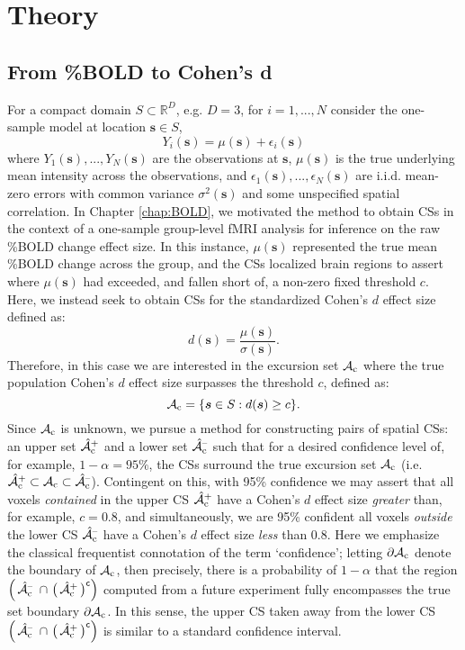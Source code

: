 \section{Theory}
\subsection{From \%BOLD to Cohen's d}
\label{sec:BOLD_to_cohen}
For a compact domain $S \subset \mathbb{R}^{D}$, e.g. $D = 3$, for $i = 1, ..., N$  consider the one-sample model at location $\bm{s} \in S$,
\begin{equation}
\label{eq:Cohen_GLM}
Y_{i}(\bm{s}) = \mu(\bm{s}) + \epsilon_{i}(\bm{s})
\end{equation}
where $Y_{1}(\bm{s}), ..., Y_{N}(\bm{s})$ are the observations at $\bm{s}$, $\mu(\bm{s})$ is the true underlying mean intensity across the observations,  
and $\epsilon_{1}(\bm{s}), ..., \epsilon_{N}(\bm{s})$ are i.i.d. mean-zero errors with common variance $\sigma^2(\bm{s})$ and some unspecified spatial correlation. In Chapter \ref{chap:BOLD}, we motivated the method to obtain CSs in the context of a one-sample group-level fMRI analysis for inference on the raw \%BOLD change effect size. In this instance, $\mu(\bm{s})$ represented the true mean \%BOLD change across the group, and the CSs localized brain regions to assert where $\mu(\bm{s})$ had exceeded, and fallen short of, a non-zero fixed threshold $c$. Here, we instead seek to obtain CSs for the standardized Cohen's $d$ effect size defined as:
\begin{equation}
\label{eq:cohens_d}
d(\bm{s}) = \frac{\mu(\bm{s})}{\sigma(\bm{s})}.
\end{equation}
Therefore, in this case we are interested in the excursion set $\operatorname{\mathcal{A}_{c}}$ where the true population Cohen's $d$ effect size surpasses the threshold $c$, defined as: 
\begin{equation}
\label{eq:Ac}
\operatorname{\mathcal{A}_{c}} = \{\bm{s} \in S : d(\bm{s}) \geq c \}.
\end{equation}
Since $\operatorname{\mathcal{A}_{c}}$ is unknown, we pursue a method for constructing pairs of spatial CSs: an upper set $\operatorname{\hat{\mathcal{A}}_{c}^+}$ and a lower set $\operatorname{\hat{\mathcal{A}}_{c}^{\textrm{--}}}$ such that for a desired confidence level of, for example, $1 - \alpha = 95\%$, the CSs surround the true excursion set $\operatorname{\mathcal{A}_{c}}$ (i.e. $\operatorname{\hat{\mathcal{A}}_{c}^+} \subset \operatorname{\mathcal{A}_{c}} \subset \operatorname{\hat{\mathcal{A}}_{c}^{\textrm{--}}}$). Contingent on this, with 95\% confidence we may assert that all voxels \textit{contained} in the upper CS $\operatorname{\hat{\mathcal{A}}_{c}^+}$ have a Cohen's $d$ effect size \textit{greater} than, for example, $c = 0.8$, and simultaneously, we are 95\% confident all voxels \textit{outside} the lower CS $\operatorname{\hat{\mathcal{A}}_{c}^{\textrm{--}}}$ have a Cohen's $d$ effect size \textit{less} than 0.8. Here we emphasize the classical frequentist connotation of the term `confidence'; letting $\operatorname{\partial\mathcal{A}_{c}}$ denote the boundary of $\operatorname{\mathcal{A}_{c}}$, then precisely, there is a probability of $1 - \alpha$ that the region $\Big(\Ahatcm \ \cap \ \big(\Ahatcp\big)^{\mathsf{c}}\Big)$ computed from a future experiment fully encompasses the true set boundary $\operatorname{\partial\mathcal{A}_{c}}$. In this sense, the upper CS taken away from the lower CS $\Big(\Ahatcm \ \cap \ \big(\Ahatcp\big)^{\mathsf{c}}\Big)$ is similar to a standard confidence interval. 

